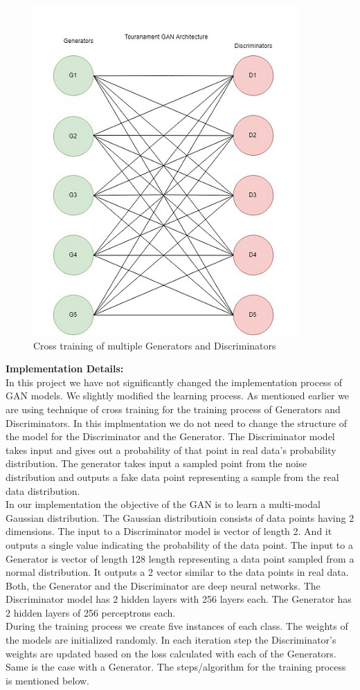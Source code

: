 \documentclass[12pt]{article}
\begin{document}
\begin{figure}
	\centering
	\includegraphics[width=0.33\linewidth]{cross_training.jpeg}
	\caption{Cross training of multiple Generators and Discriminators}
	\label{fig:cross_training}
\end{figure}

\noindent \textbf{Implementation Details:}\\

In this project we have not significantly changed the implementation process of GAN models. We slightly modified the learning process. As mentioned earlier we are using technique of cross training for the training process of Generators and Discriminators. In this implmentation we do not need to change the structure of the model for the Discriminator and the Generator. The Discriminator model takes input and gives out a probability of that point in real data's probability distribution. The generator takes input a sampled point from the noise distribution and outputs a fake data point representing a sample from the real data distribution.\\

In our implementation the objective of the GAN is to learn a multi-modal Gaussian distribution. The Gaussian distributioin consists of data points having 2 dimensions. The input to a Discriminator model is vector of length 2. And it outputs a single value indicating the probability of the data point. The input to a Generator is vector of length 128 length representing a data point sampled from a normal distribution. It outputs a 2 vector similar to the data points in real data. Both, the Generator and the Discriminator are deep neural networks. The Discriminator model has 2 hidden layers with 256 layers each. The Generator has 2 hidden layers of 256 perceptrons each.\\

During the training process we create five instances of each class. The weights of the models are initialized randomly. In each iteration step the Discriminator's weights are updated based on the loss calculated with each of the Generators. Same is the case with a Generator. The steps/algorithm for the training process is mentioned below.\\
\end{document}
